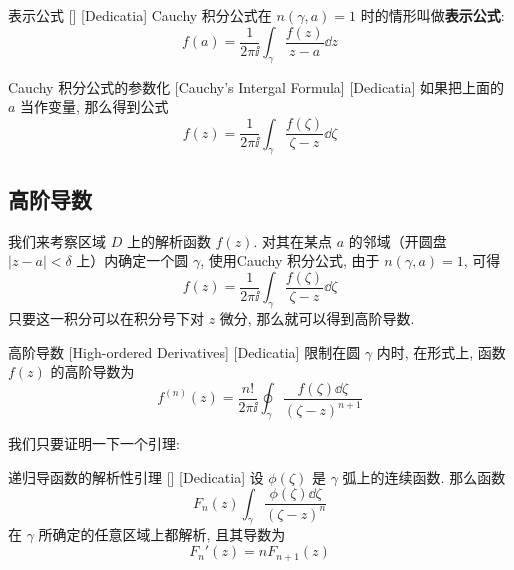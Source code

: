 \documentclass[UTF8]{ctexart}
\begin{document}
        \begin{crl}
            [CauchyRepresenting]
            {表示公式}
            []
            [Dedicatia]
            Cauchy 积分公式在 \(n(\gamma,a)=1\) 时的情形叫做\textbf{表示公式}:
            \[f(a)=\frac{1}{2\pi\ii}\int_\gamma\frac{f(z)}{z-a}\dd{z}\]
        \end{crl}

        \begin{crl}
            [UUID]
            {Cauchy 积分公式的参数化}
            [Cauchy's Intergal Formula]
            [Dedicatia]
            如果把上面的 \(a\) 当作变量, 那么得到公式
            \[f(z)=\frac{1}{2\pi\ii}\int_\gamma\frac{f(\zeta)}{\zeta-z}\dd{\zeta}\]
        \end{crl}

    \subsection{高阶导数}

        我们来考察区域 \(D\) 上的解析函数 \(f(z)\). 对其在某点 \(a\) 的邻域（开圆盘 \(|z-a|<\delta\) 上）内确定一个圆 \(\gamma\), 使用Cauchy 积分公式, 由于 \(n(\gamma,a)=1\), 可得
        \[f(z)=\frac{1}{2\pi\ii}\int_\gamma\frac{f(\zeta)}{\zeta-z}\dd{\zeta}\]
        只要这一积分可以在积分号下对 \(z\) 微分, 那么就可以得到高阶导数. 

        \begin{dfn}
            [HighOrderedDerivative]
            {高阶导数}
            [High-ordered Derivatives]
            [Dedicatia]
            限制在圆 \(\gamma\) 内时, 在形式上, 函数 \(f(z)\) 的高阶导数为
            \[f^{(n)}(z)=\frac{n!}{2\pi\ii}\oint_\gamma\frac{f(\zeta)\dd{\zeta}}{(\zeta-z)^{n+1}}\]
        \end{dfn}

        我们只要证明一下一个引理: 

        \begin{lma}
            [UUID]
            {递归导函数的解析性引理}
            []
            [Dedicatia]
            设 \(\phi(\zeta)\) 是 \(\gamma\) 弧上的连续函数. 那么函数
            \[F_n(z)\int_\gamma \frac{\phi(\zeta)\dd{\zeta}}{(\zeta-z)^n}\]
            在 \(\gamma\) 所确定的任意区域上都解析, 且其导数为
            \[F_n'(z)=nF_{n+1}(z)\]
        \end{lma}
\end{document}
